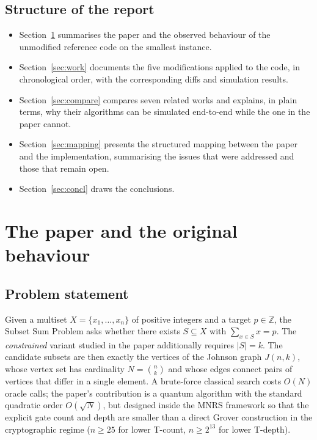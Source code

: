 \documentclass[11pt,a4paper]{article}
\begin{document}
\subsection{Structure of the report}

\begin{itemize}
\item Section~\ref{sec:paper} summarises the paper and the observed behaviour of the unmodified reference code on the smallest instance.
\item Section~\ref{sec:work} documents the five modifications applied to the code, in chronological order, with the corresponding diffs and simulation results.
\item Section~\ref{sec:compare} compares seven related works and explains, in plain terms, why their algorithms can be simulated end-to-end while the one in the paper cannot.
\item Section~\ref{sec:mapping} presents the structured mapping between the paper and the implementation, summarising the issues that were addressed and those that remain open.
\item Section~\ref{sec:concl} draws the conclusions.
\end{itemize}

\section{The paper and the original behaviour}
\label{sec:paper}

\subsection{Problem statement}

Given a multiset $X = \{x_1,\dots,x_n\}$ of positive integers and
a target $p \in \mathbb{Z}$, the Subset Sum Problem asks whether
there exists $S \subseteq X$ with $\sum_{x \in S} x = p$.
The \emph{constrained} variant studied in the paper additionally
requires $|S|=k$. The candidate subsets are then exactly the
vertices of the Johnson graph $J(n,k)$, whose vertex set has
cardinality $N=\binom{n}{k}$ and whose edges connect pairs of
vertices that differ in a single element. A brute-force classical
search costs $O(N)$ oracle calls; the paper's contribution is a
quantum algorithm with the standard quadratic order
$O(\sqrt{N})$, but designed inside the MNRS framework so that
the explicit gate count and depth are smaller than a direct
Grover construction in the cryptographic regime
($n \ge 25$ for lower T-count, $n \ge 2^{13}$ for lower T-depth).
\end{document}
